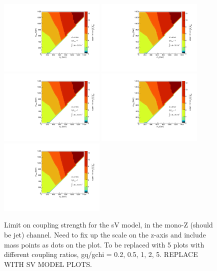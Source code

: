 \begin{figure}[!h]
\begin{center}
\includegraphics[width=0.45\textwidth]{figures/coupling_limits_TSD_1.pdf}
\includegraphics[width=0.45\textwidth]{figures/coupling_limits_TSD_1.pdf}
\includegraphics[width=0.45\textwidth]{figures/coupling_limits_TSD_1.pdf}
\includegraphics[width=0.45\textwidth]{figures/coupling_limits_TSD_1.pdf}
\includegraphics[width=0.45\textwidth]{figures/coupling_limits_TSD_1.pdf}
\caption{Limit on coupling strength for the sV model, in the mono-Z (should be jet) channel.  Need to fix up the scale on the z-axis and include mass points as dots on the plot. To be replaced with 5 plots with different coupling ratios, gq/gchi = 0.2, 0.5, 1, 2, 5. REPLACE WITH SV MODEL PLOTS.}
\label{fig:Monojet_SVD_couplinglimit}
\end{center}
\end{figure}

